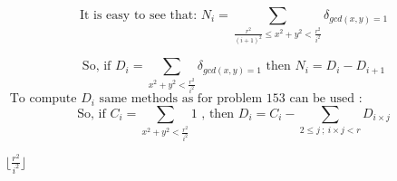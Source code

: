 \documentclass[10pt,a4paper]{letter}
\begin{document}
	


\begin{equation}
\text{It is easy to see that:  }
N_{i}=\sum
_{\frac{r^{2}}{(i+1)^{2}} \leqslant x^{2}+y^{2} < \frac {r^{2}}{i^{2}}} \delta_{gcd(x,y)=1}
\end{equation}

\begin{equation}
\text{So, if  }D_{i}=\sum
_{ x^{2}+y^{2} < \frac {r^{2}}{i^{2}}} \delta_{gcd(x,y)=1}
\text{ then } N_{i}=D_{i}-D_{i+1} 
\end{equation}
$
\text{ To compute }D_{i} \text{ same methods as for problem 153 can be used :}
$
\begin{equation}
\text{So, if  }C_{i}=\sum
_{ x^{2}+y^{2} < \frac {r^{2}}{i^{2}}}1
\text{ , then } 
D_{i} = C_{i} - \sum
_{  2\leqslant j \ ;\  i \times j < r  } D_{i\times j}
\end{equation}

$
\lfloor \frac{r^{2}}{i^{2}}\rfloor
$
\end{document}
